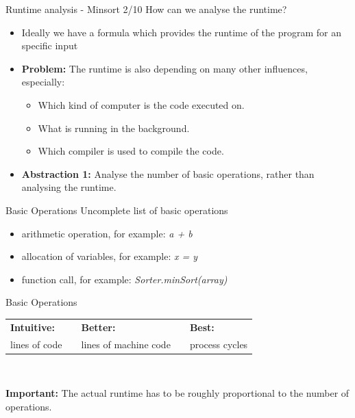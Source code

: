 \documentclass{beamer}
\begin{document}
\begin{frame}{Runtime analysis - Minsort 2/10}
  How can we analyse the runtime?
  \begin{itemize}
    \item Ideally we have a formula which provides the runtime of the
      program for an specific input
    \item<2->
      \textbf{Problem:} The runtime is also depending on many other
        influences, especially:
      \begin{itemize}
        \item
          Which kind of computer is the code executed on.
        \item What is running in the background.
        \item Which compiler is used to compile the code.
      \end{itemize}
    \item<3->
      \textbf{Abstraction 1:} Analyse the number of basic operations,
        rather than analysing the runtime.
  \end{itemize}
\end{frame}

\begin{frame}{Basic Operations}
  Uncomplete list of basic operations
  \begin{center}
    \begin{itemize}
      \item
        arithmetic operation, for example: \textit{a + b}
      \item
        allocation of variables, for example: \textit{x = y}
      \item 
        function call, for example: \textit{Sorter.minSort(array)}
    \end{itemize}
  \end{center}
\end{frame}


\begin{frame}{Basic Operations}
  \begin{tabularx}{\textwidth}{@{}XcXcX@{}}
    \cellcolor{Mittel-Blau} {\color{white}\textbf{Intuitive:}} &
    {} &
    \cellcolor{Mittel-Blau} {\color{white}\textbf{Better:}} &
    {} &
    \cellcolor{Mittel-Blau} {\color{white}\textbf{Best:}}\\[0.5em]
    \rule{0pt}{1.25em}\cellcolor{Hell-Blau}lines of code &
    {} &
    \cellcolor{Hell-Blau}lines of machine code &
    {} &
    \cellcolor{Hell-Blau}process cycles
  \end{tabularx}\\[1.5em]
  \begin{alertblock}{\textbf{Important:}}
    The actual runtime has to be roughly proportional
    to the number of operations.
  \end{alertblock}
\end{frame}
\end{document}
